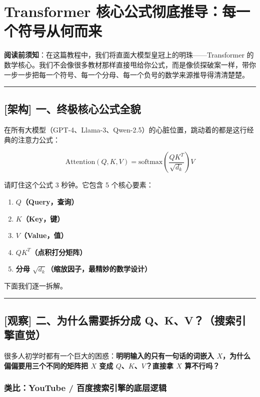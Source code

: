\chapter{Transformer 核心公式彻底推导：每一个符号从何而来}

\begin{mathBox}[核心数学定理推导]
\textbf{阅读前须知}：在这篇教程中，我们将直面大模型皇冠上的明珠——Transformer 的数学核心。我们不会像很多教材那样直接甩给你公式，而是像侦探破案一样，带你一步一步把每一个符号、每一个分母、每一个负号的数学来源推导得清清楚楚。
\end{mathBox}

\vspace{0.8em}\hrule\vspace{0.8em}

\section{[架构] 一、终极核心公式全貌}

在所有大模型（GPT-4、Llama-3、Qwen-2.5）的心脏位置，跳动着的都是这行经典的注意力公式：

\[
\text{Attention}(Q, K, V) = \text{softmax}\left(\frac{Q K^T}{\sqrt{d_k}}\right) V
\]

请盯住这个公式 3 秒钟。它包含 5 个核心要素：
\begin{enumerate}
  \item \textbf{$Q$（Query，查询）}
  \item \textbf{$K$（Key，键）}
  \item \textbf{$V$（Value，值）}
  \item \textbf{$Q K^T$（点积打分矩阵）}
  \item \textbf{分母 $\sqrt{d_k}$（缩放因子，最精妙的数学设计）}
\end{enumerate}

下面我们逐一拆解。

\vspace{0.8em}\hrule\vspace{0.8em}

\section{[观察] 二、为什么需要拆分成 Q、K、V？（搜索引擎直觉）}

很多人初学时都有一个巨大的困惑：\textbf{明明输入的只有一句话的词嵌入 $X$，为什么偏偏要用三个不同的矩阵把 $X$ 变成 $Q$、$K$、$V$？直接拿 $X$ 算不行吗？}

\subsection{类比：YouTube / 百度搜索引擎的底层逻辑}

